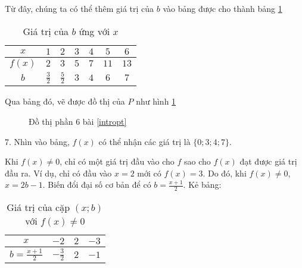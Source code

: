 Từ đây, chúng ta có thể thêm giá trị của $b$ vào bảng được cho thành bảng \ref{tab:b_values6}

\begin{table}[h]
   \centering
   \begin{tabular}{|c|c|c|c|c|c|c|}
      \hline
      $x$ & $1$ & $2$ & $3$ & $4$ & $5$ & $6$\\
      \hline
      $f(x)$ & $2$ & $3$ & $5$ & $7$ & $11$ & $13$\\
      \hline
      $b$ & $\frac{3}{2}$ & $\frac{5}{2}$ & $3$ & $4$ & $6$ & $7$\\
      \hline
   \end{tabular}
   \caption{Giá trị của $b$ ứng với $x$}
   \label{tab:b_values6}
\end{table}

Qua bảng đó, vẽ được đồ thị của $P$ như hình \ref{fig:dtp6}

\begin{figure}[h]
   \centering
   \caption{Đồ thị phần 6 bài \ref{intropt}}
   \label{fig:dtp6}
\end{figure}

7. Nhìn vào bảng, $f(x)$ có thể nhận các giá trị là $\{0; 3; 4; 7\}$.

Khi $f(x) \neq 0$, chỉ có một giá trị đầu vào cho $f$ sao cho $f(x)$ đạt được giá trị đầu ra. Ví dụ, chỉ có đầu vào $x = 2$ mới có $f(x) = 3$. Do đó, khi $f(x) \neq 0$, $x = 2b-1$. Biến đổi đại số cơ bản để có $b = \frac{x + 1}{2}$. Kẻ bảng:

\begin{table}[h]
   \centering
   \begin{tabular}{|c|c|c|c|}
      \hline
      $x$ & $-2$ & $2$ & $-3$\\
      \hline
      $b = \frac{x+1}{2}$ & $-\frac{3}{2}$ & $2$ & $-1$\\
      \hline
   \end{tabular}
   \caption{Giá trị của cặp $(x; b)$ với $f(x) \neq 0$}
   \label{tab:b_values7}
\end{table}

